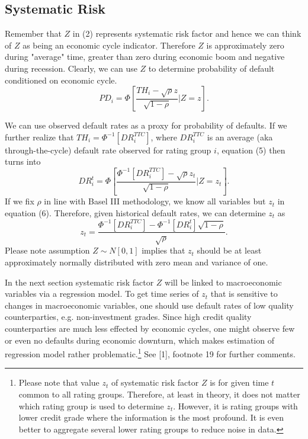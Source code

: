 \documentclass[a4paper]{article}
\begin{document}
\subsection{Systematic Risk}

Remember that $Z$ in (2) represents systematic risk factor and hence 
we can think of $Z$ as being an economic cycle indicator. Therefore $Z$ is approximately 
zero during "average" time, greater than zero during economic boom and negative during recession.
Clearly, we can use $Z$ to determine probability of 
default conditioned on economic cycle.
\begin{equation}
PD_i = \Phi\left[\frac{TH_i - \sqrt{\rho}z}{\sqrt{1 - \rho}} | Z = 
z\right].
\end{equation}

We can use observed default rates as a proxy for probability of 
defaults. If we further realize that $TH_i = \Phi^{-1}[DR_i^{TTC}]$, where $DR_i^{TTC}$ is an average (aka through-the-cycle) default
rate observed for rating group $i$, equation (5) then turns into
\begin{equation}
DR_i^t= \Phi \left[\frac{\Phi^{-1}[DR_i^{TTC}] - \sqrt{\rho}z_t}{\sqrt{1 - \rho}} | Z = z_t \right].
\end{equation}
If we fix $\rho$ in line with Basel III methodology, we know all 
variables but $z_t$ in equation (6). Therefore, given historical default rates, we can 
determine $z_t$ as
\begin{equation}
z_t = \frac{\Phi^{-1}[DR_i^{TTC}] - \Phi^{-1}[DR_i^t]\sqrt{1 - \rho}}{\sqrt{\rho}}.
\end{equation}
Please note assumption $Z \sim N[0, 1]$ implies that $z_t$ should be at 
least approximately normally distributed with zero mean and variance of one.

In the next section systematic risk factor $Z$ will be linked to 
macroeconomic variables via a regression model. To get time series of 
$z_t$ that is sensitive to changes in macroeconomic variables, one 
should use default rates of low quality counterparties, e.g. non-investment 
grades. Since high credit quality counterparties are much less effected by 
economic cycles, one might observe few or even no defaults during 
economic downturn, which makes estimation of regression model 
rather problematic.\footnote{Please note that value $z_t$ of systematic risk factor 
$Z$ is for given time $t$ common to all rating groups. Therefore, at 
least in theory, it does not matter which rating group is used to 
determine $z_t$. However, it is rating groups with lower credit grade 
where the information is the most profound. It is even better to 
aggregate several lower rating groups to reduce noise in data.} See [1], footnote 19 for 
further comments.
\end{document}
